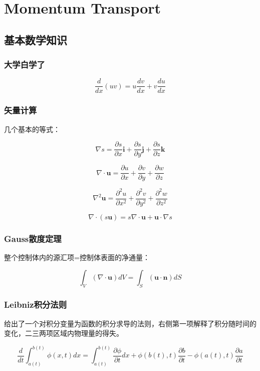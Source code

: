 \chapter{Momentum Transport}

\section{基本数学知识}
\subsection{大学白学了}

\[\frac{d}{dx}(uv) = u\frac{dv}{dx} + v\frac{du}{dx}\]

\subsection{矢量计算}

几个基本的等式：

\[\nabla s = \frac{\partial s}{\partial x}\bm{i} +  \frac{\partial s}{\partial y}\bm{j} + \frac{\partial s}{\partial z}\bm{k}\]

\[\nabla\cdot\bm{u} = \frac{\partial u}{\partial x} + \frac{\partial v}{\partial y} + \frac{\partial w}{\partial z}\]

\[\nabla^2\bm{u} = \frac{\partial^2 u}{\partial x^2} + \frac{\partial^2 v}{\partial y^2} + \frac{\partial^2 w}{\partial z^2} \]

\[\nabla\cdot (s\bm{u}) = s\nabla\cdot\bm{u}+\bm{u}\cdot\nabla s\]

\subsection{Gauss散度定理}
整个控制体内的源汇项=控制体表面的净通量：

\begin{equation}\label{Gauss}
\int_{V}(\nabla\cdot \bm{u})dV = \int_{S} (\bm{u\cdot n})dS
\end{equation}

\subsection{Leibniz积分法则}

给出了一个对积分变量为函数的积分求导的法则，右侧第一项解释了积分随时间的变化，二三两项区域内物理量的得失。

\begin{equation}
    \frac{d}{dt} \int_{a(t)}^{b(t)} \phi(x,t) dx = \int_{a(t)}^{b(t)} \frac{\partial \phi}{\partial t} dx + \phi(b(t),t) \frac{\partial b}{\partial t} - \phi(a(t),t)\frac{\partial a}{\partial t}
\end{equation}

